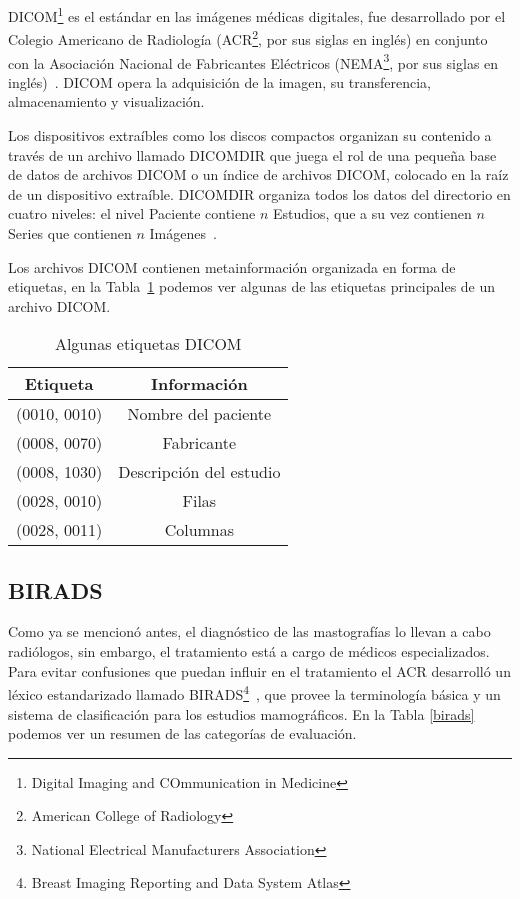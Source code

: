 DICOM\footnote{Digital Imaging and COmmunication in Medicine} es el estándar en
las imágenes médicas digitales, fue desarrollado por el Colegio Americano de
Radiología (ACR\footnote{American College of Radiology}, por sus siglas en
inglés) en conjunto con la Asociación Nacional de Fabricantes Eléctricos
(NEMA\footnote{National Electrical Manufacturers Association}, por sus siglas
en inglés)~\cite{national1996digital}. DICOM opera la adquisición de la imagen,
su transferencia, almacenamiento y visualización. 

Los dispositivos extraíbles como los discos compactos organizan su contenido a
través de un archivo llamado DICOMDIR que juega el rol de una pequeña base de
datos de archivos DICOM o un índice de archivos DICOM, colocado en la raíz de
un dispositivo extraíble. DICOMDIR organiza todos los datos del directorio en 
cuatro niveles: el nivel Paciente contiene $n$ Estudios, que a su vez contienen
$n$ Series que contienen $n$ Imágenes~\cite{pianykh2011digital}.  

Los archivos DICOM contienen metainformación organizada en forma de etiquetas,
en la Tabla~\ref{dicom:tags} podemos ver algunas de las etiquetas principales
de un archivo DICOM. 

\begin{table}
  \caption[Etiquetas DICOM]{Algunas etiquetas DICOM} 
  \label{dicom:tags}
\begin{center}
{\scriptsize
    \begin{tabular}{c|c}
    \hline
    {\bf Etiqueta} & 
    {\bf Información} \\
    \hline
    (0010, 0010) & Nombre del paciente\\
    (0008, 0070) & Fabricante\\
    (0008, 1030) & Descripción del estudio\\
    (0028, 0010) & Filas\\
    (0028, 0011) & Columnas\\
    \hline
    \end{tabular}
}
\end{center}
\end{table}

\subsection{BIRADS}

Como ya se mencionó antes, el diagnóstico de las mastografías lo llevan a cabo
radiólogos, sin embargo, el tratamiento está a cargo de médicos especializados.
Para evitar confusiones que puedan influir en el tratamiento el ACR desarrolló
un léxico estandarizado llamado BIRADS\footnote{Breast Imaging Reporting and
Data System Atlas}~\cite{reston2003birads}, que provee la terminología básica
y un sistema de clasificación para los estudios mamográficos. En la Tabla
\ref{birads} podemos ver un resumen de las categorías de evaluación.

